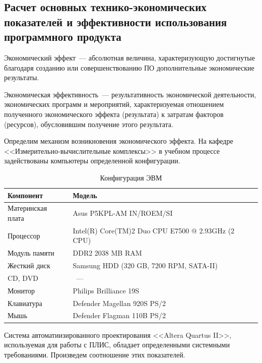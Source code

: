 \subsection{Расчет основных технико-экономических показателей и эффективности использования программного продукта} \label{sec:money-2}

Экономический эффект~--- абсолютная величина, характеризующую достигнутые благодаря созданию или совершенствованию ПО дополнительные экономические результаты.

Экономическая эффективность~--- результативность экономической деятельности, экономических программ и мероприятий, характеризуемая отношением полученного экономического эффекта (результата) к затратам факторов (ресурсов), обусловившим получение этого результата.

Определим механизм возникновения экономического эффекта.
На кафедре <<Измерительно-вычислительные комплексы>> в учебном процессе задействованы компьютеры определенной конфигурации.

\begin{table}[H]
  \caption{Конфигурация ЭВМ}\label{table:pc-specs}
  \begin{tabular}{|l|p{}|}
    \hline
      \textbf{Компонент} & \textbf{Модель}
    \\ \hline
      Материнская плата  & Asus P5KPL-AM IN/ROEM/SI
    \\ \hline
      Процессор          & Intel(R) Core(TM)2 Duo CPU E7500 @ 2.93GHz (2 CPU)
    \\ \hline
      Модуль памяти      & DDR2 2038 MB RAM
    \\ \hline
      Жесткий диск       & Samsung HDD (320 GB, 7200 RPM, SATA-II)
    \\ \hline
      CD, DVD            &~---
    \\ \hline
      Монитор            & Philips Brilliance 19S
    \\ \hline
      Клавиатура         & Defender Magellan 920S PS/2
    \\ \hline
      Мышь               & Defender Flagman 110B PS/2
    \\ \hline
  \end{tabular}
\end{table}

Система автоматиизированного проектирования <<Altera Quartus II>>, используемая для работы с ПЛИС, обладает определенными системными требованиями.
Произведем соотношение этих показателей.

